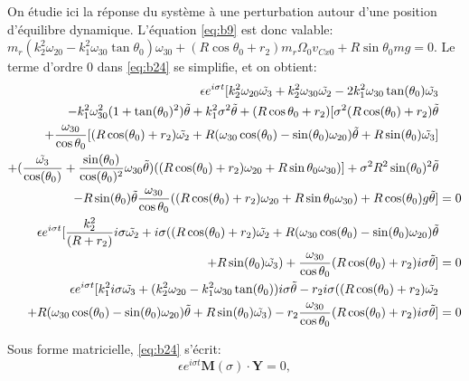 On étudie ici la réponse du système à une perturbation autour d'une position d'équilibre dynamique. L'équation \ref{eq:b9} est donc valable: $m_r(k_2^2\omega_{20}-k_1^2\omega_{30} \tan{\theta_0})\omega_{30} +(R\cos{\theta_0}+r_2)m_r \Omega_0 v_{Cx0} + R\sin{\theta_0}mg =0$.
Le terme d'ordre 0 dans \ref{eq:b24} se simplifie, et on obtient:
\begin{align}
    \epsilon e^{i \sigma t} [k_2^2 \omega_{20} \tilde{\omega_3}+k_2^2 \omega_{30} \tilde{\omega_2} -2k_1^2\omega_{30} \tan(\theta_0)\tilde{\omega_3} & \nonumber \\
    -k_1^2 \omega_{30}^2(1+\tan(\theta_0)^2)\tilde{\theta} +k_1^2 \sigma^2 \tilde{\theta}+(R\cos{\theta_0}+r_2)[\sigma^2 ( R\cos(\theta_0)+r_2) \tilde{\theta} & \nonumber \\
    +\frac{\omega_{30}}{\cos{\theta_0}} [(R\cos(\theta_0)+r_2) \Tilde{\omega_2}+R(\omega_{30}\cos(\theta_0)-\sin(\theta_0)\omega_{20}) \Tilde{\theta}+R\sin(\theta_0) \Tilde{\omega_3} ] & \nonumber \\
    + (\frac{\tilde{\omega_3}}{\cos(\theta_0)}+\frac{\sin(\theta_0)}{\cos(\theta_0)^2}\omega_{30}\tilde{\theta})((R\cos(\theta_0)+r_2)\omega_{20}+R \sin{\theta_0}\omega_{30})]+ \sigma^2 R^2 \sin(\theta_0)^2  \tilde{\theta}& \nonumber \\
    -R\sin(\theta_0)\tilde{\theta}\frac{\omega_{30}}{\cos{\theta_0}}  ((R\cos(\theta_0)+r_2)\omega_{20}+R \sin{\theta_0}\omega_{30})+R\cos(\theta_0)g\tilde{\theta}] &=0 \nonumber\\ 
     \epsilon e^{i \sigma t}[\frac{k_2^2}{(R+r_2)} i \sigma \Tilde{\omega_2}+i \sigma((R\cos(\theta_0)+r_2) \Tilde{\omega_2} +R(\omega_{30}\cos(\theta_0)-\sin(\theta_0)\omega_{20}) \Tilde{\theta}& \nonumber \\
    +R\sin(\theta_0) \Tilde{\omega_3})+\frac{\omega_{30}}{\cos{\theta_0}} (R\cos(\theta_0)+r_2) i \sigma \tilde{\theta}]  &= 0
     \nonumber\\
    \epsilon e^{i \sigma t} [k_1^2 i \sigma\Tilde{\omega_3}+ (k_2^2\omega_{20}-k_1^2\omega_{30} \tan(\theta_0)) i \sigma \tilde{\theta} -r_2 i \sigma ((R\cos(\theta_0)+r_2) \Tilde{\omega_2} & \nonumber \\
    +R(\omega_{30}\cos(\theta_0)-\sin(\theta_0)\omega_{20}) \Tilde{\theta}+R\sin(\theta_0) \Tilde{\omega_3} )- r_2\frac{\omega_{30}}{\cos{\theta_0}} (R\cos(\theta_0)+r_2) i \sigma \tilde{\theta}] &= 0
  \label{eq:b24b}
\end{align}

Sous forme matricielle, \ref{eq:b24} s'écrit:
\begin{equation}
    \epsilon e^{i\sigma t} \mathbf{M}(\sigma) \cdot \mathbf{Y}  = 0,
\end{equation}


